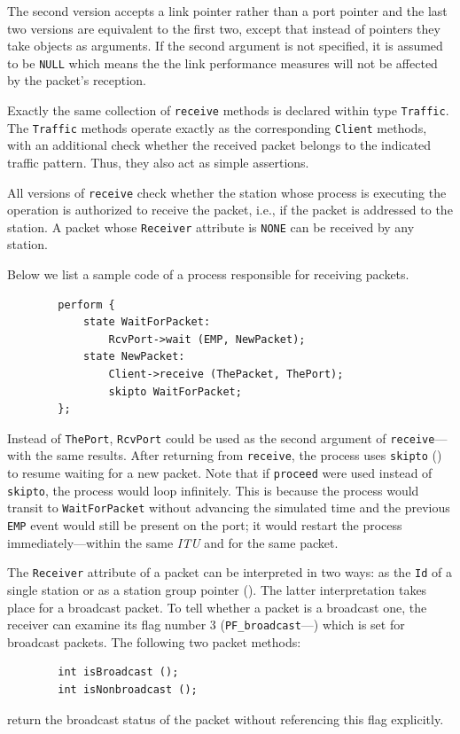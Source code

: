 The second version accepts a link pointer rather than a port pointer and the
last two versions are equivalent to the first two, except that instead
of pointers they take objects as arguments.
If the second argument is not specified, it is assumed to be
{\tt NULL} which means the the link performance measures will not be affected
by the packet's reception.

Exactly the same collection of {\tt receive} methods is declared within
type {\tt Traffic}.
The {\tt Traffic} methods operate exactly as the corresponding {\tt Client}
methods, with an additional check whether the received packet belongs to
the indicated traffic pattern.
Thus, they also act as simple assertions.

All versions of {\tt receive} check whether
the station whose process is executing
the operation is authorized to receive the packet, i.e., if the packet is
addressed to the station.
A packet whose {\tt Receiver} attribute is {\tt NONE} can be received by any
station.

Below we list a sample code of a process responsible for receiving packets.
\begin{verbatim}
        perform {
            state WaitForPacket:
                RcvPort->wait (EMP, NewPacket);
            state NewPacket:
                Client->receive (ThePacket, ThePort);
                skipto WaitForPacket;
        };
\end{verbatim}

Instead of {\tt ThePort}, {\tt RcvPort} could be used as the second
argument of {\tt receive}---with the same results.
After returning from {\tt receive}, the process uses {\tt skipto}
() to resume waiting for a new packet.
Note that if {\tt proceed} were used instead
of {\tt skipto}, the process would loop infinitely.
This is because the process would transit 
to {\tt WaitForPacket} without advancing
the simulated time and the previous
{\tt EMP} event would still be present on the port; it would
restart the process immediately---within the same {\em ITU\/}
and for the same packet.

The {\tt Receiver} attribute of a packet can be interpreted in two
ways: as the {\tt Id} of a single station or as a station group
pointer ().
The latter interpretation takes place for a broadcast packet.
To tell whether a packet is a broadcast one, the receiver
can examine its flag
number 3 ({\tt PF\_broadcast}---)
which is set for broadcast packets.
The following two packet methods:
\begin{verbatim}
        int isBroadcast ();
        int isNonbroadcast ();
\end{verbatim}
return the broadcast status of the packet without referencing
this flag explicitly.

